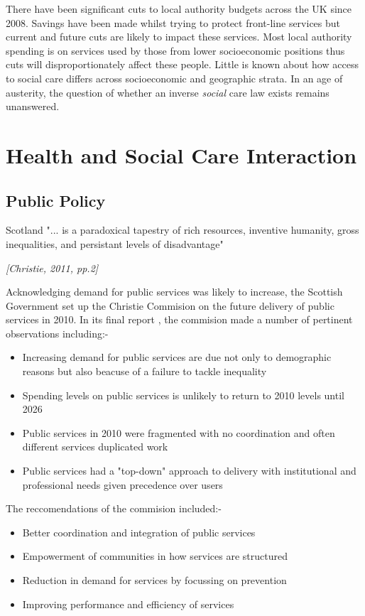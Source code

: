 \documentclass[12pt,]{report}
\begin{document}
There have been significant cuts to local authority budgets across the
UK since 2008. Savings have been made whilst trying to protect
front-line services but current and future cuts are likely to impact
these services. Most local authority spending is on services used by
those from lower socioeconomic positions thus cuts will
disproportionately affect these people. Little is known about how access
to social care differs across socioeconomic and geographic strata. In an
age of austerity, the question of whether an inverse \emph{social} care
law exists remains unanswered.

\section{Health and Social Care Interaction}\label{sec:hsc-interaction}

\subsection{Public Policy}\label{subsec:policy}

\epigraph{Scotland "... is a paradoxical tapestry of rich resources, inventive humanity, gross inequalities, and persistant levels of disadvantage"}{\textit{[Christie, 2011, pp.2]}}

Acknowledging demand for public services was likely to increase, the
Scottish Government set up the Christie Commision on the future delivery
of public services in 2010. In its final report \citep{RN451}, the
commision made a number of pertinent observations including:-

\begin{itemize}[noitemsep]
\item Increasing demand for public services are due not only to demographic reasons but also beacuse of a failure to tackle inequality
\item Spending levels on public services is unlikely to return to 2010 levels until 2026
\item Public services in 2010 were fragmented with no coordination and often different services duplicated work
\item Public services had a "top-down" approach to delivery with institutional and professional needs given precedence over users
\end{itemize}

The reccomendations of the commision included:-

\begin{itemize}[noitemsep]
\item Better coordination and integration of public services
\item Empowerment of communities in how services are structured
\item Reduction in demand for services by focussing on prevention
\item Improving performance and efficiency of services
\end{itemize}
\end{document}
